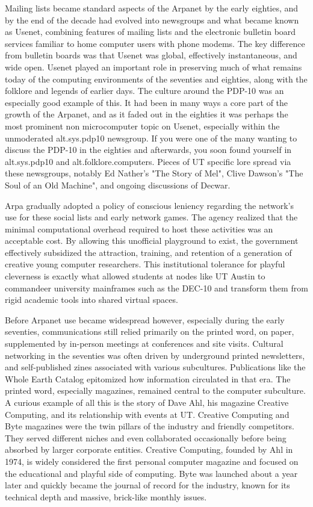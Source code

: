Mailing lists became standard aspects of the Arpanet by the early eighties, and by the end of the decade had evolved into newsgroups and what became known as Usenet, combining features of mailing lists and the electronic bulletin board services familiar to home computer users with phone modems. The key difference from bulletin boards was that Usenet was global, effectively instantaneous, and wide open. Usenet played an important role in preserving much of what remains today of the computing environments of the seventies and eighties, along with the folklore and legends of earlier days. The culture around the PDP-10 was an especially good example of this. It had been in many ways a core part of the growth of the Arpanet, and as it faded out in the eighties it was perhaps the most prominent non microcomputer topic on Usenet, especially within the unmoderated alt.sys.pdp10 newsgroup. If you were one of the many wanting to discuss the PDP-10 in the eighties and afterwards, you soon found yourself in alt.sys.pdp10 and alt.folklore.computers. Pieces of UT specific lore spread via these newsgroups, notably Ed Nather's "The Story of Mel", Clive Dawson's "The Soul of an Old Machine", and ongoing discussions of Decwar. \cite{natherStoryMel1983} \cite{dawsonSoulOldMachine1982} \cite{haubenNetizensHistoryImpact1997}

Arpa gradually adopted a policy of conscious leniency regarding the network's use for these social lists and early network games. The agency realized that the minimal computational overhead required to host these activities was an acceptable cost. By allowing this unofficial playground to exist, the government effectively subsidized the attraction, training, and retention of a generation of creative young computer researchers. This institutional tolerance for playful cleverness is exactly what allowed students at nodes like UT Austin to commandeer university mainframes such as the DEC-10 and transform them from rigid academic tools into shared virtual spaces.

Before Arpanet use became widespread however, especially during the early seventies, communications still relied primarily on the printed word, on paper, supplemented by in-person meetings at conferences and site visits. Cultural networking in the seventies was often driven by underground printed newsletters, and self-published zines associated with various subcultures. Publications like the Whole Earth Catalog epitomized how information circulated in that era. The printed word, especially magazines, remained central to the computer subculture. A curious example of all this is the story of Dave Ahl, his magazine Creative Computing, and its relationship with events at UT. Creative Computing and Byte magazines were the twin pillars of the industry and friendly competitors. They served different niches and even collaborated occasionally before being absorbed by larger corporate entities. Creative Computing, founded by Ahl in 1974, is widely considered the first personal computer magazine and focused on the educational and playful side of computing. Byte was launched about a year later and quickly became the journal of record for the industry, known for its technical depth and massive, brick-like monthly issues. \cite{turnerCountercultureCybercultureStewart2006}

